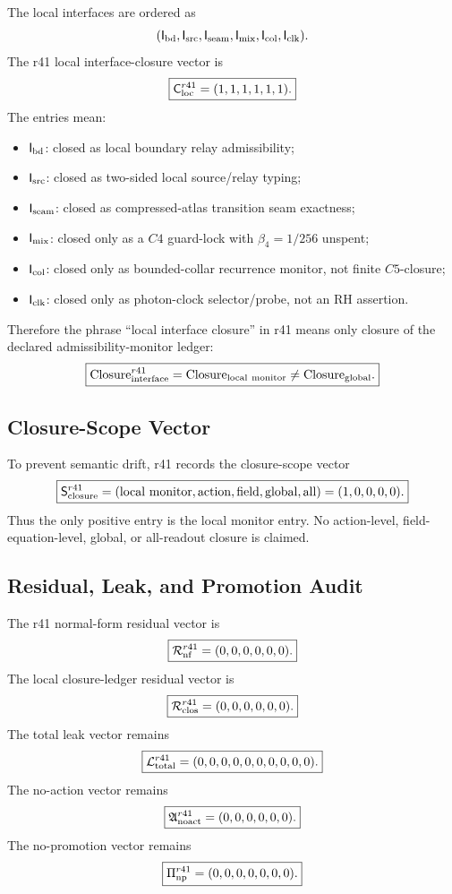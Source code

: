 The local interfaces are ordered as
\[
(\mathsf I_{\rm bd},\mathsf I_{\rm src},\mathsf I_{\rm seam},
\mathsf I_{\rm mix},\mathsf I_{\rm col},\mathsf I_{\rm clk}).
\]
The r41 local interface-closure vector is
\[
\boxed{
\mathsf C_{\rm loc}^{r41}=(1,1,1,1,1,1).
}
\]
The entries mean:
\begin{itemize}
    \item \(\mathsf I_{\rm bd}\): closed as local boundary relay admissibility;
    \item \(\mathsf I_{\rm src}\): closed as two-sided local source/relay typing;
    \item \(\mathsf I_{\rm seam}\): closed as compressed-atlas transition seam exactness;
    \item \(\mathsf I_{\rm mix}\): closed only as a \(C4\) guard-lock with \(\beta_4=1/256\) unspent;
    \item \(\mathsf I_{\rm col}\): closed only as bounded-collar recurrence monitor, not finite \(C5\)-closure;
    \item \(\mathsf I_{\rm clk}\): closed only as photon-clock selector/probe, not an RH assertion.
\end{itemize}
Therefore the phrase ``local interface closure'' in r41 means only closure of
the declared admissibility-monitor ledger:
\[
\boxed{
\mathrm{Closure}_{\rm interface}^{r41}
=
\mathrm{Closure}_{\rm local\ monitor}
\neq
\mathrm{Closure}_{\rm global}.
}
\]

\subsection{Closure-Scope Vector}
\label{subsec:r41-closure-scope-vector}

To prevent semantic drift, r41 records the closure-scope vector
\[
\boxed{
\mathsf S_{\rm closure}^{r41}
=({\rm local\ monitor},{\rm action},{\rm field},{\rm global},{\rm all})
=(1,0,0,0,0).
}
\]
Thus the only positive entry is the local monitor entry.  No action-level,
field-equation-level, global, or all-readout closure is claimed.

\subsection{Residual, Leak, and Promotion Audit}
\label{subsec:r41-residual-leak-promotion-audit}

The r41 normal-form residual vector is
\[
\boxed{
\mathcal R_{\rm nf}^{r41}=(0,0,0,0,0,0).
}
\]
The local closure-ledger residual vector is
\[
\boxed{
\mathcal R_{\rm clos}^{r41}=(0,0,0,0,0,0).
}
\]
The total leak vector remains
\[
\boxed{
\mathcal L_{\rm total}^{r41}=(0,0,0,0,0,0,0,0,0,0).
}
\]
The no-action vector remains
\[
\boxed{
\mathfrak A_{\rm noact}^{r41}=(0,0,0,0,0,0).
}
\]
The no-promotion vector remains
\[
\boxed{
\Pi_{\rm np}^{r41}=(0,0,0,0,0,0,0).
}
\]

